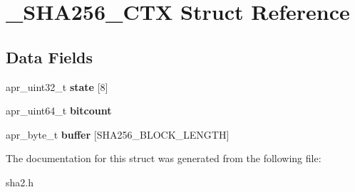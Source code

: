 \hypertarget{struct___s_h_a256___c_t_x}{\section{\-\_\-\-S\-H\-A256\-\_\-\-C\-T\-X Struct Reference}
\label{struct___s_h_a256___c_t_x}
}
\subsection*{Data Fields}
\begin{DoxyCompactItemize}
\item 
\hypertarget{struct___s_h_a256___c_t_x_a651ee21c1ee494e3a6f755f1586acba7}{apr\-\_\-uint32\-\_\-t {\bfseries state} \mbox{[}8\mbox{]}}\label{struct___s_h_a256___c_t_x_a651ee21c1ee494e3a6f755f1586acba7}

\item 
\hypertarget{struct___s_h_a256___c_t_x_ad7f82a082163b345b5ac7a0f9478e5a6}{apr\-\_\-uint64\-\_\-t {\bfseries bitcount}}\label{struct___s_h_a256___c_t_x_ad7f82a082163b345b5ac7a0f9478e5a6}

\item 
\hypertarget{struct___s_h_a256___c_t_x_a64c78dd109eb135023e28c3b17ea0c59}{apr\-\_\-byte\-\_\-t {\bfseries buffer} \mbox{[}S\-H\-A256\-\_\-\-B\-L\-O\-C\-K\-\_\-\-L\-E\-N\-G\-T\-H\mbox{]}}\label{struct___s_h_a256___c_t_x_a64c78dd109eb135023e28c3b17ea0c59}

\end{DoxyCompactItemize}


The documentation for this struct was generated from the following file\-:\begin{DoxyCompactItemize}
\item 
sha2.\-h\end{DoxyCompactItemize}
